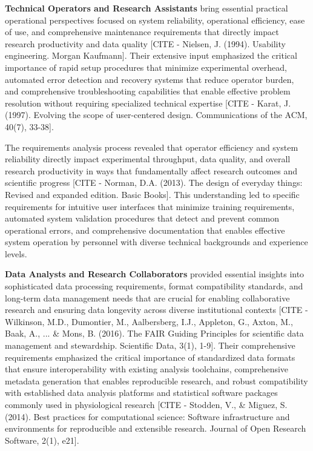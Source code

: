 \documentclass[11pt,a4paper]{report}
\begin{document}
\textbf{Technical Operators and Research Assistants} bring essential practical operational perspectives focused on system
reliability, operational efficiency, ease of use, and comprehensive maintenance requirements that directly impact
research productivity and data quality [CITE - Nielsen, J. (1994). Usability engineering. Morgan Kaufmann]. Their
extensive input emphasized the critical importance of rapid setup procedures that minimize experimental overhead,
automated error detection and recovery systems that reduce operator burden, and comprehensive troubleshooting
capabilities that enable effective problem resolution without requiring specialized technical
expertise [CITE - Karat, J. (1997). Evolving the scope of user-centered design. Communications of the ACM, 40(7), 33-38].

The requirements analysis process revealed that operator efficiency and system reliability directly impact experimental
throughput, data quality, and overall research productivity in ways that fundamentally affect research outcomes and
scientific
progress [CITE - Norman, D.A. (2013). The design of everyday things: Revised and expanded edition. Basic Books]. This
understanding led to specific requirements for intuitive user interfaces that minimize training requirements, automated
system validation procedures that detect and prevent common operational errors, and comprehensive documentation that
enables effective system operation by personnel with diverse technical backgrounds and experience levels.

\textbf{Data Analysts and Research Collaborators} provided essential insights into sophisticated data processing
requirements, format compatibility standards, and long-term data management needs that are crucial for enabling
collaborative research and ensuring data longevity across diverse institutional
contexts [CITE - Wilkinson, M.D., Dumontier, M., Aalbersberg, I.J., Appleton, G., Axton, M., Baak, A., ... \& Mons, B. (2016). The FAIR Guiding Principles for scientific data management and stewardship. Scientific Data, 3(1), 1-9].
Their comprehensive requirements emphasized the critical importance of standardized data formats that ensure
interoperability with existing analysis toolchains, comprehensive metadata generation that enables reproducible
research, and robust compatibility with established data analysis platforms and statistical software packages commonly
used in physiological
research [CITE - Stodden, V., \& Miguez, S. (2014). Best practices for computational science: Software infrastructure and environments for reproducible and extensible research. Journal of Open Research Software, 2(1), e21].
\end{document}
